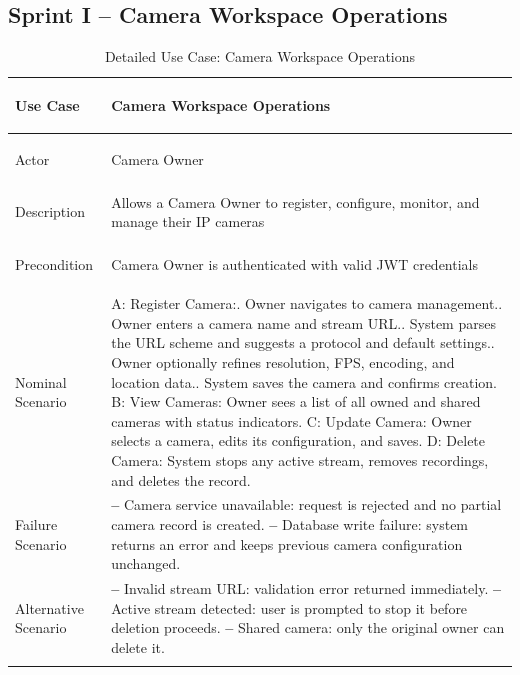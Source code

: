 \documentclass[12pt,a4paper,oneside]{report}
\newlength{\TblTwoKeyW}
\newlength{\TblTwoValW}
\begin{document}
\subsection*{Sprint I -- Camera Workspace Operations}
{\small
\begin{longtable}{|>{\bfseries\raggedright\arraybackslash}p{\TblTwoKeyW}|>{\raggedright\arraybackslash}p{\TblTwoValW}|}
\hline
Use Case    & Camera Workspace Operations \\ \hline
Actor       & Camera Owner \\ \hline
Description & Allows a Camera Owner to register, configure, monitor, and manage their IP cameras \\ \hline
Precondition & Camera Owner is authenticated with valid JWT credentials \\ \hline
Nominal Scenario &
A: Register Camera:\newline
1. Owner navigates to camera management.\newline
2. Owner enters a camera name and stream URL.\newline
3. System parses the URL scheme and suggests a protocol and default settings.\newline
4. Owner optionally refines resolution, FPS, encoding, and location data.\newline
5. System saves the camera and confirms creation.\newline
B: View Cameras: Owner sees a list of all owned and shared cameras with status indicators.\newline
C: Update Camera: Owner selects a camera, edits its configuration, and saves.\newline
D: Delete Camera: System stops any active stream, removes recordings, and deletes the record. \\ \hline
Failure Scenario &
\textbf{--} Camera service unavailable: request is rejected and no partial camera record is created.\newline
\textbf{--} Database write failure: system returns an error and keeps previous camera configuration unchanged. \\ \hline
Alternative Scenario &
\textbf{--} Invalid stream URL: validation error returned immediately.\newline
\textbf{--} Active stream detected: user is prompted to stop it before deletion proceeds.\newline
\textbf{--} Shared camera: only the original owner can delete it. \\ \hline
\caption{Detailed Use Case: Camera Workspace Operations}
\label{tab:app_uc_cameras}
\end{longtable}
}
\end{document}
